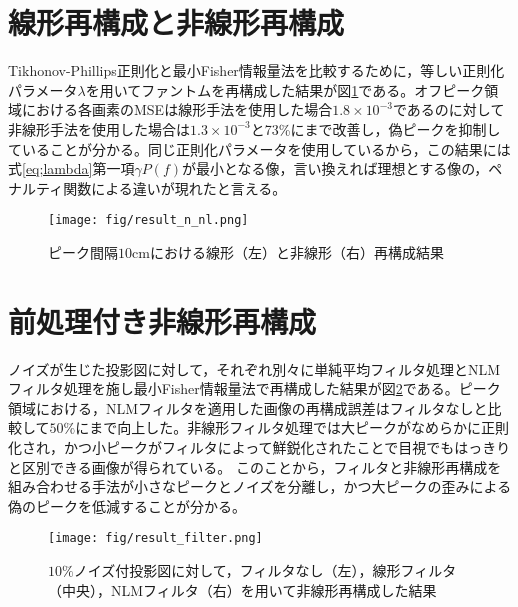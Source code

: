 \section{線形再構成と非線形再構成}
Tikhonov-Phillips正則化と最小Fisher情報量法を比較するために，等しい正則化パラメータ$\lambda$を用いてファントムを再構成した結果が図\ref{fig:result_n_nl10}である。オフピーク領域における各画素のMSEは線形手法を使用した場合$1.8\times 10^{-3}$であるのに対して非線形手法を使用した場合は$1.3\times 10^{-3}$と73\%にまで改善し，偽ピークを抑制していることが分かる。同じ正則化パラメータを使用しているから，この結果には式\ref{eq;lambda}第一項$\gamma P(f)$が最小となる像，言い換えれば理想とする像の，ペナルティ関数による違いが現れたと言える。
\begin{figure}[H]
	 \centering
	 \texttt{[image: fig/result\_n\_nl.png]}
	 \caption{ピーク間隔$10\mathrm{cm}$における線形（左）と非線形（右）再構成結果}
	 \label{fig:result_n_nl10}
\end{figure}

\section{前処理付き非線形再構成}
ノイズが生じた投影図に対して，それぞれ別々に単純平均フィルタ処理とNLMフィルタ処理を施し最小Fisher情報量法で再構成した結果が図\ref{fig:result_filter}である。ピーク領域における，NLMフィルタを適用した画像の再構成誤差はフィルタなしと比較して$50\%$にまで向上した。非線形フィルタ処理では大ピークがなめらかに正則化され，かつ小ピークがフィルタによって鮮鋭化されたことで目視でもはっきりと区別できる画像が得られている。
このことから，フィルタと非線形再構成を組み合わせる手法が小さなピークとノイズを分離し，かつ大ピークの歪みによる偽のピークを低減することが分かる。
\begin{figure}[H]
	 \centering
	 \texttt{[image: fig/result\_filter.png]}
	 \caption{$10\%$ノイズ付投影図に対して，フィルタなし（左），線形フィルタ（中央），NLMフィルタ（右）を用いて非線形再構成した結果}
	 \label{fig:result_filter}
\end{figure}
